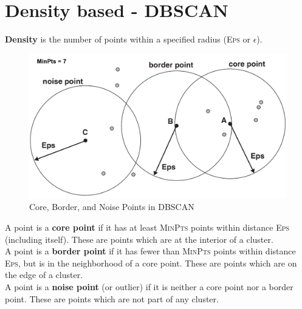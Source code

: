 \section{Density based - DBSCAN}

\begin{definition}
	[Density]
	\textbf{Density} is the number of points within a specified radius (\textsc{Eps} or $\epsilon$).
\end{definition}

\begin{figure}[htbp]
	\centering
	\includegraphics{images/04/densitypoints.png}
	\caption{Core, Border, and Noise Points in DBSCAN}
	\label{fig:04/densitypoints}
\end{figure}

A point is a \textbf{core point} if it has at least \textsc{MinPts} points within distance \textsc{Eps} (including itself). These are points which are at the interior of a cluster.\\
A point is a \textbf{border point} if it has fewer than \textsc{MinPts} points within distance \textsc{Eps}, but is in the neighborhood of a core point. These are points which are on the edge of a cluster.\\
A point is a \textbf{noise point} (or outlier) if it is neither a core point nor a border point. These are points which are not part of any cluster.


